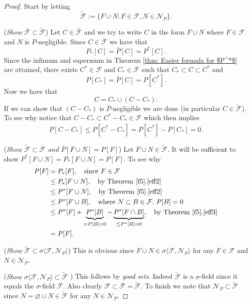 \begin{proof}
Start by letting
\[
\widetilde{\mathcal F} :=\{F\cup N: F\in \mathcal F, N\in \mathcal N_P  \}.
\]

({\sl Show $\bar{\mathcal F}\subset \widetilde{\mathcal F}$})
Let $C\in \bar{\mathcal F}$ and we try to write $C$ in the form $F\cup N$ where $F\in \mathcal F$ and $N$ is $P$-negligible. Since  $C\in \bar{\mathcal F}$ we have that
\[ P_*[C] = \bar P[C] = P^*[C]. \]
Since the infimum and supermum in Theorem \ref{thm: Easier formula for $P^*$} are attained,
 there exists $C^*\in\mathcal F$ and $C_*\in \mathcal F$ such that $C_* \subset C\subset C^*$ and
\[ P[C_*] = \bar P[C] = P[C^*]. \]
Now we have that
\[
C = C_* \cup (C-C_*).
\]
If we can show that $(C-C_*)$ is $P$-negligible we are done (in particular $C\in \widetilde{\mathcal F}$). To see why notice that $C-C_*  \subset C^*-C_* \in \mathcal F$ which then implies
\begin{align*}
 P[C-C_*]\leq P[C^*-C_*] = P[C^*]-P[C_*] = 0.
\end{align*}

({\sl Show $\widetilde{\mathcal F}\subset \bar{\mathcal F}$ and $\bar P[F\cup N] = P[F]$}) Let $F\cup N\in \widetilde{\mathcal F}$. It will be sufficient to show $P^*[F\cup N] = P_*[F\cup N] = P[F]$. To see why
\begin{align*}
P[F] &= P_*[F],\quad\text{since $F\in \mathcal F$} \\
&\leq P_*[F\cup N],\quad\text{by Theorem \ref{f5}.\ref{eff2}} \\
&\leq P^*[F\cup N],\quad\text{by Theorem \ref{f5}.\ref{eff2}} \\
&\leq P^*[F\cup B],\quad\text{where $N\subset B\in \mathcal F$, $P[B]=0$} \\
&\leq P^*[F] + \underbrace{P^*[B]}_{=P[B]=0} - \underbrace{P^*[F\cap B]}_{\leq P^*[B]=0},\quad\text{by Theorem \ref{f5}.\ref{eff3}} \\
&= P[F].
\end{align*}

({\sl Show $\widetilde{\mathcal F}\subset \sigma\langle \mathcal F, \mathcal N_P  \rangle$}) This is obvious since $F\cup N \in  \sigma\langle \mathcal F, \mathcal N_P  \rangle$ for any $F\in \mathcal F$ and $N\in \mathcal N_P$.

({\sl Show $\sigma\langle \mathcal F,  \mathcal N_P  \rangle\subset \widetilde{\mathcal F}$ }) This follows by {\sl good sets}. Indeed  $\widetilde{\mathcal F}$ is a $\sigma$-field since it equals the $\sigma$-field $\bar{\mathcal F}$. Also clearly $\mathcal F\subset \bar{\mathcal F} = \widetilde{\mathcal F}$. To finish we note that $\mathcal N_P\subset \widetilde{\mathcal F}$ since $N = \varnothing \cup N\in \widetilde{\mathcal  F}$ for any $N\in \mathcal N_P$.
\end{proof}




